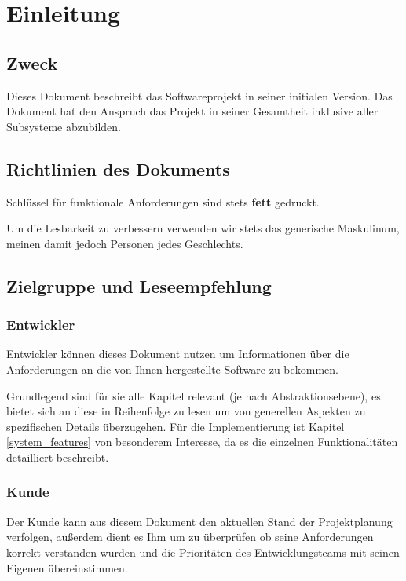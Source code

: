 \section{Einleitung}
\subsection{Zweck}
Dieses Dokument beschreibt das Softwareprojekt  in seiner initialen Version.
Das Dokument hat den Anspruch das Projekt in seiner Gesamtheit inklusive aller Subsysteme abzubilden.

\subsection{Richtlinien des Dokuments}

Schlüssel für funktionale Anforderungen sind stets \textbf{fett} gedruckt.

Um die Lesbarkeit zu verbessern verwenden wir stets das generische Maskulinum, meinen damit jedoch Personen jedes Geschlechts.

\subsection{Zielgruppe und Leseempfehlung}
\subsubsection{Entwickler}

Entwickler können dieses Dokument nutzen um Informationen über die Anforderungen an die von Ihnen hergestellte Software zu bekommen. 

Grundlegend sind für sie alle Kapitel relevant (je nach Abstraktionsebene), es bietet sich an diese in Reihenfolge zu lesen um von generellen Aspekten zu spezifischen Details überzugehen. 
Für die Implementierung ist Kapitel \ref{system_features} von besonderem Interesse, da es die einzelnen Funktionalitäten detailliert beschreibt.

\subsubsection{Kunde}
Der Kunde kann aus diesem Dokument den aktuellen Stand der Projektplanung verfolgen, 
außerdem dient es Ihm um zu überprüfen ob seine Anforderungen korrekt verstanden wurden und die Prioritäten des Entwicklungsteams mit seinen Eigenen übereinstimmen.

